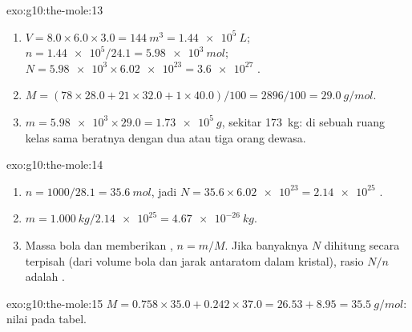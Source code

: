 \begin{solution}{exo:g10:the-mole:13}
\begin{enumerate}
  \item $V = 8.0 \times 6.0 \times 3.0 = \qty{144}{m^3} =
        \qty{1.44e5}{L}$; $n = \num{1.44e5} / 24.1 = \qty{5.98e3}{mol}$;
        $N = \num{5.98e3} \times \num{6.02e23} = \num{3.6e27}$ .
  \item $M = (78 \times 28.0 + 21 \times 32.0 + 1 \times 40.0) / 100 =
        2896 / 100 = \qty{29.0}{g/mol}$.
  \item $m = \num{5.98e3} \times 29.0 = \qty{1.73e5}{g}$, sekitar
        \qty{173}{kg}:  di sebuah ruang kelas sama beratnya dengan
        dua atau tiga orang dewasa.
\end{enumerate}
\end{solution}

\begin{solution}{exo:g10:the-mole:14}
\begin{enumerate}
  \item $n = 1000 / 28.1 = \qty{35.6}{mol}$, jadi
        $N = 35.6 \times \num{6.02e23} = \num{2.14e25}$ .
  \item $m = \qty{1.000}{kg} / \num{2.14e25} = \qty{4.67e-26}{kg}$.
  \item Massa bola dan  memberikan ,
        $n = m / M$. Jika banyaknya  $N$ dihitung secara terpisah
        (dari volume bola dan jarak antaratom dalam kristal), rasio
        $N / n$ adalah .
\end{enumerate}
\end{solution}

\begin{solution}{exo:g10:the-mole:15}
$M = 0.758 \times 35.0 + 0.242 \times 37.0 = 26.53 + 8.95 =
\qty{35.5}{g/mol}$: nilai pada tabel.
\end{solution}

